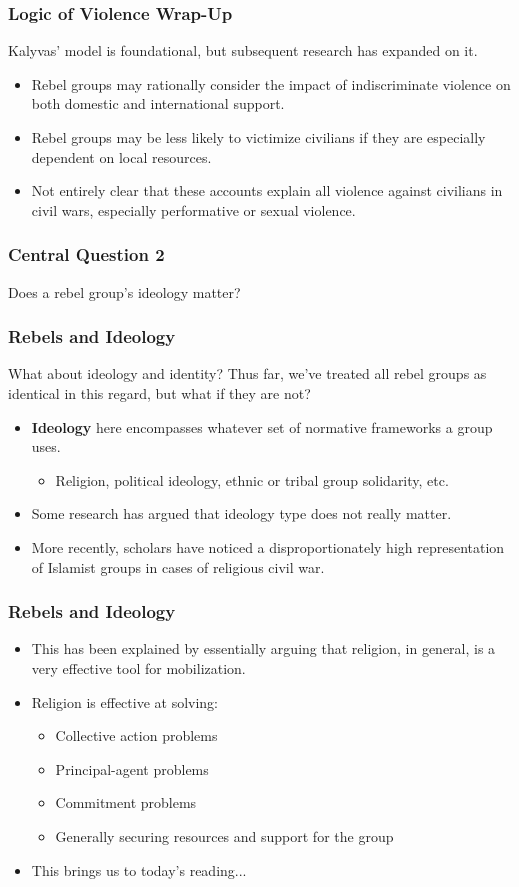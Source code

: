\documentclass[handout]{beamer}
\begin{document}
\begin{frame} 
	\frametitle{\LARGE{Logic of Violence Wrap-Up}}
Kalyvas' model is foundational, but subsequent research has expanded on it.
	\begin{itemize}
		\item Rebel groups may rationally consider the impact of indiscriminate violence on both domestic and international support. \pause
		\item Rebel groups may be less likely to victimize civilians if they are especially dependent on local resources. \pause
		\item Not entirely clear that these accounts explain all violence against civilians in civil wars, especially performative or sexual violence.
	\end{itemize}
\end{frame}

\begin{frame} 
	\frametitle{\LARGE{Central Question 2}}
	\centering
	\Large{Does a rebel group's ideology matter?} 
\end{frame}

\begin{frame} 
	\frametitle{\LARGE{Rebels and Ideology}}
What about ideology and identity? Thus far, we've treated all rebel groups as identical in this regard, but what if they are not? \pause
	\begin{itemize}
		\item \textbf{Ideology} here encompasses whatever set of normative frameworks a group uses.
		\begin{itemize}
			\item Religion, political ideology, ethnic or tribal group solidarity, etc. \pause
		\end{itemize}
		\item Some research has argued that ideology type does not really matter. \pause
		\item More recently, scholars have noticed a disproportionately high representation of Islamist groups in cases of religious civil war. \pause
	\end{itemize}
\end{frame}

\begin{frame} 
	\frametitle{\LARGE{Rebels and Ideology}}
	\begin{itemize}
		\item This has been explained by essentially arguing that religion, in general, is a very effective tool for mobilization.\pause
		\item Religion is effective at solving: \pause
		\begin{itemize}
			\item Collective action problems \pause
			\item Principal-agent problems \pause
			\item Commitment problems \pause
			\item Generally securing resources and support for the group \pause
		\end{itemize}
	\item This brings us to today's reading...
	\end{itemize}
\end{frame}
\end{document}
